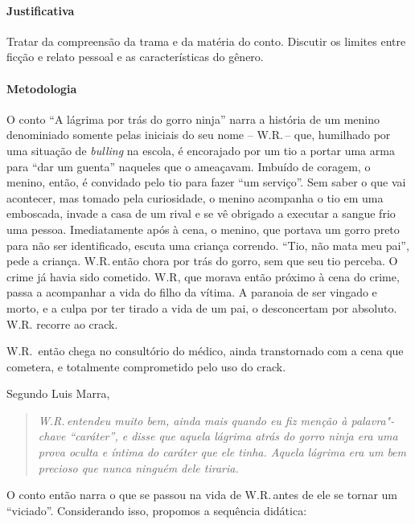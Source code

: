 \documentclass[12pt]{extarticle}
\begin{document}
\paragraph{Justificativa} Tratar da compreensão da trama e da matéria do conto. 
Discutir os limites entre ficção e relato pessoal e as características do 
gênero. 

\paragraph{Metodologia}
 O conto ``A lágrima por trás do gorro ninja'' narra a história de um menino denominiado 
 somente pelas iniciais do seu nome -- W.R.\,-- que, 
 humilhado por uma situação de \textit{bulling} na escola, é encorajado por um tio
 a portar uma arma para ``dar um guenta'' naqueles que o ameaçavam. Imbuído de coragem, 
 o menino, então, é convidado pelo tio para fazer ``um serviço''. Sem saber o que vai 
 acontecer, mas tomado pela curiosidade, o menino acompanha o tio em uma emboscada, 
 invade a casa de um rival e se vê obrigado a executar a sangue frio uma pessoa. 
 Imediatamente após à cena, o menino, que portava um gorro preto para não ser 
 identificado, escuta uma criança correndo. ``Tio, não mata meu pai'', pede 
 a criança. W.R.\,então chora por trás do gorro, sem que seu tio perceba. 
 O crime já havia sido cometido. W.R, que morava então próximo 
 à cena do crime, passa a acompanhar a vida do filho da vítima. A paranoia de ser vingado
 e morto, e a culpa por ter tirado a vida de um pai, o desconcertam por absoluto. 
 W.R. recorre ao crack. 

 W.R.~então chega no consultório do médico, 
 ainda transtornado com a cena que cometera, e totalmente comprometido pelo 
 uso do crack. 

  Segundo Luis Marra, 
\begin{quote}
\textit{W.R.\,entendeu muito bem, ainda mais quando eu fiz menção à palavra"-chave
``caráter'', e disse que aquela lágrima atrás do gorro ninja era uma
prova oculta e íntima do caráter que ele tinha. Aquela lágrima era um
bem precioso que nunca ninguém dele tiraria.}
\end{quote}

O conto então narra o que se passou na vida de W.R.\,antes de ele se tornar 
um ``viciado''. Considerando isso, propomos a sequência didática:  
\end{document}
